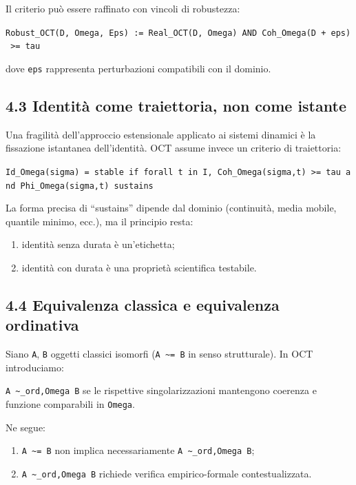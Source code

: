 Il criterio può essere raffinato con vincoli di robustezza:

\texttt{Robust\_OCT(D,\ Omega,\ Eps)\ :=\ Real\_OCT(D,\ Omega)\ AND\ Coh\_Omega(D\ +\ eps)\ \textgreater{}=\ tau\textquotesingle{}}

dove \texttt{eps} rappresenta perturbazioni compatibili con il dominio.

\subsection{4.3 Identità come traiettoria, non come istante}

Una fragilità dell'approccio estensionale applicato ai sistemi dinamici è la fissazione istantanea dell'identità. OCT assume invece un criterio di traiettoria:

\texttt{Id\_Omega(sigma)\ =\ stable\ if\ forall\ t\ in\ I,\ Coh\_Omega(sigma,t)\ \textgreater{}=\ tau\ and\ Phi\_Omega(sigma,t)\ sustains}

La forma precisa di ``sustains'' dipende dal dominio (continuità, media mobile, quantile minimo, ecc.), ma il principio resta:

\begin{enumerate}
\def\labelenumi{\arabic{enumi}.}
\tightlist
\item
  identità senza durata è un'etichetta;
\item
  identità con durata è una proprietà scientifica testabile.
\end{enumerate}

\subsection{4.4 Equivalenza classica e equivalenza ordinativa}

Siano \texttt{A}, \texttt{B} oggetti classici isomorfi (\texttt{A\ \textasciitilde{}=\ B} in senso strutturale). In OCT introduciamo:

\texttt{A\ \textasciitilde{}\_ord,Omega\ B} se le rispettive singolarizzazioni mantengono coerenza e funzione comparabili in \texttt{Omega}.

Ne segue:

\begin{enumerate}
\def\labelenumi{\arabic{enumi}.}
\tightlist
\item
  \texttt{A\ \textasciitilde{}=\ B} non implica necessariamente \texttt{A\ \textasciitilde{}\_ord,Omega\ B};
\item
  \texttt{A\ \textasciitilde{}\_ord,Omega\ B} richiede verifica empirico-formale contestualizzata.
\end{enumerate}

